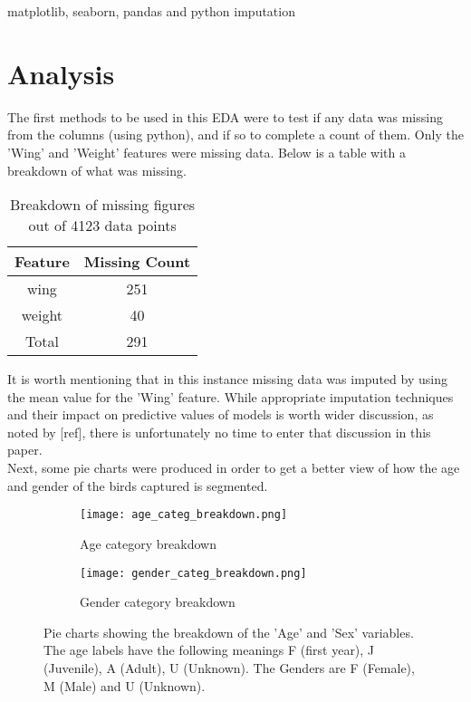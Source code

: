 \documentclass{article}
\begin{document}
matplotlib, seaborn, pandas and python imputation



\section{Analysis}
The first methods to be used in this EDA were to test if any data was missing from the columns (using python), and if so to complete a count of them. Only the 'Wing' and 'Weight' features were missing data. Below is a table with a breakdown of what was missing.\\

\begin{table}[h]
\begin{center}
\begin{tabular}{c|c}

Feature & Missing Count\\
\hline
wing & 251\\
\hline
weight & 40\\
\hline
Total & 291
\end{tabular}
\end{center}
\caption{Breakdown of missing figures out of 4123 data points}
\label{tab.myfirst}
\end{table}

It is worth mentioning that in this instance missing data was imputed by using the mean value for the 'Wing' feature. While appropriate imputation techniques and their impact on predictive values of models is worth wider discussion, as noted by [ref], there is unfortunately no time to enter that discussion in this paper.\\

Next, some pie charts were produced in order to get a better view of how the age and gender of the birds captured is segmented.\\

\begin{figure}[hbt!]
     \centering
     \begin{subfigure}[b]{0.49\textwidth}
         \centering
         \texttt{[image: age\_categ\_breakdown.png]}
         \caption{Age category breakdown}
         \label{fig:aAge category breakdown}
     \end{subfigure}
     \hfill
     \begin{subfigure}[b]{0.49\textwidth}
         \centering
         \texttt{[image: gender\_categ\_breakdown.png]}
         \caption{Gender category breakdown}
         \label{fig:Gender category breakdown}
     \end{subfigure}
     \hfill
    \caption{Pie charts showing the breakdown of the 'Age' and 'Sex' variables. The age labels have the following meanings F (first year), J (Juvenile), A (Adult), U (Unknown). The Genders are F (Female), M (Male) and U (Unknown).}
    \label{fig:three graphs}
\end{figure}
\end{document}
